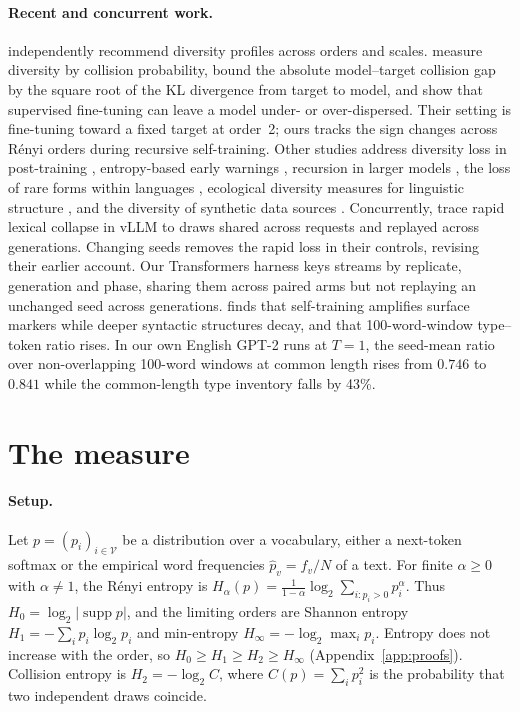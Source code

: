 \documentclass[10pt]{article}
\theoremstyle{plain}
\theoremstyle{definition}
\newcommand{\V}{\mathcal{V}}
\newcommand{\ph}{\hat p}
\newcommand{\Htwo}{H_2}
\begin{document}
\paragraph{Recent and concurrent work.} \citet{hu2026profiles} independently recommend
diversity profiles across orders and scales. \citet{skobelev2026finetuning} measure diversity by collision
probability, bound the absolute model--target collision gap by the square root of the KL
divergence from target to model, and show that supervised fine-tuning can leave a model
under- or over-dispersed. Their setting is fine-tuning toward a fixed target at order~2;
ours tracks the sign changes across R\'enyi orders during recursive self-training. Other studies address diversity loss in
post-training \citep{karouzos2026where}, entropy-based early warnings \citep{zhang2026silent},
recursion in larger models \citep{nakamura2026demystifying}, the loss of rare forms within
languages \citep{vanmassenhove2026tail}, ecological diversity measures for linguistic structure
\citep{gude2026aligned}, and the diversity of synthetic data sources
\citep{schaffelder2026eggs}. Concurrently, \citet{liu2026fragility} trace rapid lexical collapse
in vLLM to draws shared across requests and replayed across generations. Changing seeds removes
the rapid loss in their controls, revising their earlier account. Our Transformers harness
keys streams by replicate, generation and phase, sharing them across paired arms but not
replaying an unchanged seed across generations. \citet{liu2026restructures} finds that self-training amplifies
surface markers while deeper syntactic structures decay, and that 100-word-window type--token
ratio rises. In our own English GPT-2 runs at $T=1$, the seed-mean ratio over non-overlapping
100-word windows at common length rises from $0.746$ to $0.841$ while the common-length type inventory falls by
43\%.

\section{The measure}
\label{sec:measure}

\paragraph{Setup.} Let $p=(p_i)_{i\in\V}$ be a distribution over a vocabulary, either a
next-token softmax or the empirical word frequencies $\ph_v=f_v/N$ of a text. For finite
$\alpha\ge0$ with $\alpha\ne1$, the R\'enyi entropy is
$H_\alpha(p)=\frac{1}{1-\alpha}\log_2\sum_{i:p_i>0}p_i^\alpha$. Thus
$H_0=\log_2|\operatorname{supp}p|$, and the limiting orders are Shannon entropy
$H_1=-\sum_i p_i\log_2p_i$ and min-entropy $H_\infty=-\log_2\max_i p_i$. Entropy does not
increase with the order, so $H_0\ge H_1\ge\Htwo\ge H_\infty$ (Appendix~\ref{app:proofs}).
Collision entropy is $\Htwo=-\log_2 C$, where $C(p)=\sum_i p_i^2$ is the probability that two
independent draws coincide.
\end{document}
